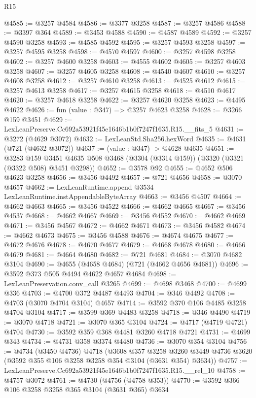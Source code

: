 \begin{lexlean}{R15}
\begin{coremodule}
@4585 := @3257 @4584
@4586 := @3377 @3258
@4587 := @3257 @4586
@4588 := @3397 @364
@4589 := @3453 @4588
@4590 := @4587 @4589
@4592 := @3257 @4590 @3258
@4593 := @4585 @4592
@4595 := @3257 @4593 @3258
@4597 := @3257 @4595 @3258
@4598 := @4570 @4597
@4600 := @3257 @4598 @3258
@4602 := @3257 @4600 @3258
@4603 := @4555 @4602
@4605 := @3257 @4603 @3258
@4607 := @3257 @4605 @3258
@4608 := @4540 @4607
@4610 := @3257 @4608 @3258
@4612 := @3257 @4610 @3258
@4613 := @4525 @4612
@4615 := @3257 @4613 @3258
@4617 := @3257 @4615 @3258
@4618 := @4510 @4617
@4620 := @3257 @4618 @3258
@4622 := @3257 @4620 @3258
@4623 := @4495 @4622
@4626 := fun (value : @347) => @3257 @4623 @3258
@4628 := @3266 @159 @3451
@4629 := LexLeanPreserve.Cc692a53921f45e1646b1b0f7247f1635.R15.__fits_5
@4631 := @3272 (@4629 @3072)
@4632 := LexLeanStd.Sha256.hexWord
@4635 := @4631 (@721 (@4632 @3072))
@4637 := (value : @347) -> @4628 @4635
@4651 := @3283
    @159
    @3451
    @4635
    @508
    @3468
    (@3304 (@3314 @159))
    (@3320 (@3321 (@3322 @508) @3451 @3298))
@4652 := @3578 @92
@4655 := @4652 @506 @4623 @3258
@4656 := @3456 @4492
@4657 := @721 @4656
@4658 := @3070 @4657
@4662 := LexLeanRuntime.append @3534 LexLeanRuntime.instAppendableByteArray
@4663 := @3456 @4507
@4664 := @4662 @4663
@4665 := @3456 @4522
@4666 := @4662 @4665
@4667 := @3456 @4537
@4668 := @4662 @4667
@4669 := @3456 @4552
@4670 := @4662 @4669
@4671 := @3456 @4567
@4672 := @4662 @4671
@4673 := @3456 @4582
@4674 := @4662 @4673
@4675 := @3456 @4588
@4676 := @4674 @4675
@4677 := @4672 @4676
@4678 := @4670 @4677
@4679 := @4668 @4678
@4680 := @4666 @4679
@4681 := @4664 @4680
@4682 := @721 @4681
@4684 := @3070 @4682 @3104
@4690 := @4655 (@4658 @4684) (@721 (@4662 @4656 @4681))
@4696 := @3592 @373 @505 @4494 @4622 @4657 @4684
@4698 := LexLeanPreservation.conv_call @3265
@4699 := @4698 @3468
@4700 := @4699 @336
@4703 := @4700 @372 @4487 @4493
@4704 := @346 @4492
@4708 := @4703 (@3070 @4704 @3104) @4657
@4714 := @3592 @370 @106 @4485 @3258 @4704 @3104
@4717 := @3599 @369 @4483 @3258
@4718 := @346 @4490
@4719 := @3070 @4718
@4721 := @3070 @365 @3104
@4724 := @4717 (@4719 @4721) @4704
@4730 := @3592 @359 @368 @4481 @3260 @4718 @4721
@4731 := @4699 @343
@4734 := @4731 @358 @3374 @4480
@4736 := @3070 @354 @3104
@4756 := @4734
    (@3450 @4736)
    @4718
    (@3608
      @357
      @3258
      @3260
      @3449
      @4736
      @3620
      (@3592 @355 @106 @3258 @3258 @354 @3104 (@3631 @354) @3634))
@4757 := LexLeanPreserve.Cc692a53921f45e1646b1b0f7247f1635.R15.__rel_10
@4758 := @4757 @3072
@4761 := @4730 (@4756 (@4758 @353))
@4770 := @3592 @366 @106 @3258 @3258 @365 @3104 (@3631 @365) @3634

\end{coremodule}
\end{lexlean}
